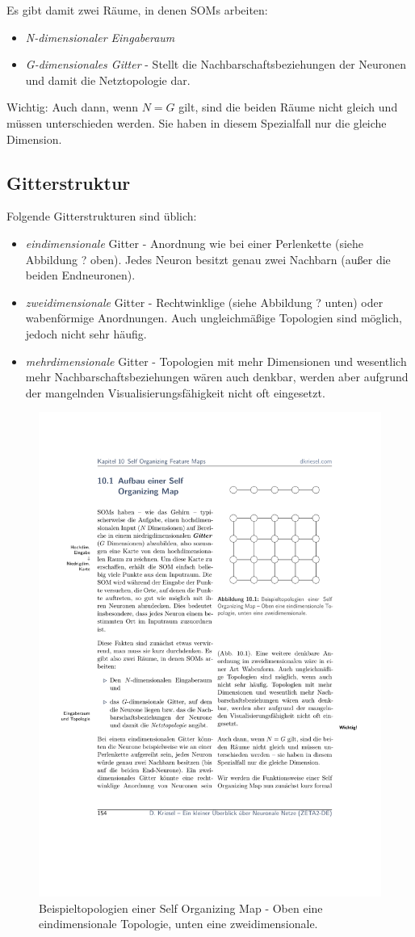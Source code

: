 Es gibt damit zwei Räume, in denen SOMs arbeiten:
\begin{itemize}
	\item \emph{N-dimensionaler Eingaberaum}
	\item \emph{G-dimensionales Gitter} - Stellt die Nachbarschaftsbeziehungen der Neuronen und damit die Netztopologie dar. 
\end{itemize}

Wichtig: Auch dann, wenn $N = G$ gilt, sind die beiden Räume nicht gleich und müssen unterschieden werden. Sie haben in diesem Spezialfall nur die gleiche Dimension.

\subsection*{Gitterstruktur}
Folgende Gitterstrukturen sind üblich:
\begin{itemize}
	\item \emph{eindimensionale} Gitter - Anordnung wie bei einer Perlenkette (siehe Abbildung ? oben). Jedes Neuron besitzt genau zwei Nachbarn (außer die beiden Endneuronen).
	\item \emph{zweidimensionale} Gitter - Rechtwinklige (siehe Abbildung ? unten) oder wabenförmige Anordnungen. Auch ungleichmäßige Topologien sind möglich, jedoch nicht sehr häufig.
	\item \emph{mehrdimensionale} Gitter - Topologien mit mehr Dimensionen und wesentlich mehr Nachbarschaftsbeziehungen wären auch denkbar, werden aber aufgrund der mangelnden Visualisierungsfähigkeit nicht oft eingesetzt.
\end{itemize}

\begin{figure}[ht!] \centering 
	\includegraphics[width=0.5\linewidth]{figures/ch08_som-gitter.pdf}
	\caption{Beispieltopologien einer Self Organizing Map - Oben eine eindimensionale Topologie, unten eine zweidimensionale.}
	\label{fig:ch08_som-gitter}
\end{figure}



